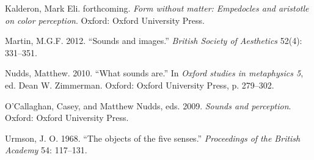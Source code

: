 \documentclass[sloppy, journal, git, anonymise]{humapap}
\begin{document}
Kalderon, Mark Eli. forthcoming. \emph{Form without matter: Empedocles
and aristotle on color perception}. Oxford: Oxford University Press.

Martin, M.G.F. 2012. ``Sounds and images.'' \emph{British Society of
Aesthetics} 52(4): 331--351.

Nudds, Matthew. 2010. ``What sounds are.'' In \emph{Oxford studies in
metaphysics 5}, ed. Dean W. Zimmerman. Oxford: Oxford University Press,
p. 279--302.

O'Callaghan, Casey, and Matthew Nudds, eds. 2009. \emph{Sounds and
perception}. Oxford: Oxford University Press.

Urmson, J. O. 1968. ``The objects of the five senses.''
\emph{Proceedings of the British Academy} 54: 117--131.
\end{document}
